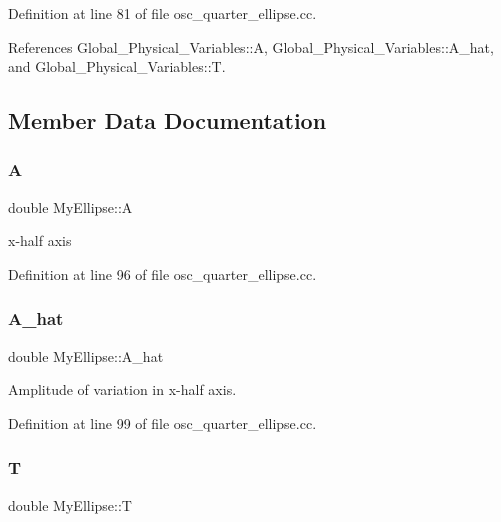 Definition at line 81 of file osc\+\_\+quarter\+\_\+ellipse.\+cc.



References Global\+\_\+\+Physical\+\_\+\+Variables\+::A, Global\+\_\+\+Physical\+\_\+\+Variables\+::\+A\+\_\+hat, and Global\+\_\+\+Physical\+\_\+\+Variables\+::T.



\subsection{Member Data Documentation}
\mbox{\label{classMyEllipse_aa2a0efd0a39f9d4fc307a6ff011682ed}} 
\subsubsection{\texorpdfstring{A}{A}}
{\footnotesize\ttfamily double My\+Ellipse\+::A\hspace{0.3cm}{\ttfamily [private]}}



x-\/half axis 



Definition at line 96 of file osc\+\_\+quarter\+\_\+ellipse.\+cc.

\mbox{\label{classMyEllipse_a653e71cf296cdc86cc595d16f18004dd}} 
\subsubsection{\texorpdfstring{A\+\_\+hat}{A\_hat}}
{\footnotesize\ttfamily double My\+Ellipse\+::\+A\+\_\+hat\hspace{0.3cm}{\ttfamily [private]}}



Amplitude of variation in x-\/half axis. 



Definition at line 99 of file osc\+\_\+quarter\+\_\+ellipse.\+cc.

\mbox{\label{classMyEllipse_ab098069ab23bbbd8f30b0da3523dc87f}} 
\subsubsection{\texorpdfstring{T}{T}}
{\footnotesize\ttfamily double My\+Ellipse\+::T\hspace{0.3cm}{\ttfamily [private]}}



